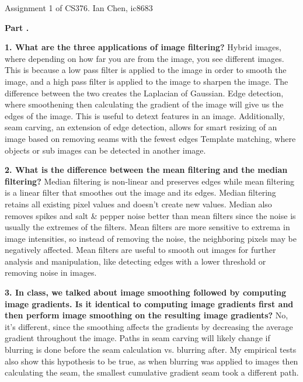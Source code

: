 \documentclass[11pt]{article}
\begin{document}
    Assignment 1 of CS376. Ian Chen, ic8683\newline
    
    \textbf{Part .}\newline

    \textbf{1. What are the three applications of image filtering?}\newline
    Hybrid images, where depending on how far you are from the image, you see different images.
    This is because a low pass filter is applied to the image in order to smooth the image, and a high pass filter is applied to the image
    to sharpen the image. The difference between the two creates the Laplacian of Gaussian.\newline
    Edge detection, where smoothening then calculating the gradient of the image will give us the edges of the image. This is useful to detext
    features in an image. Additionally, seam carving, an extension of edge detection, allows for smart resizing of an image based on removing seams
with the fewest edges\newline
    Template matching, where objects or sub images can be detected in another image.\newline

    \textbf{2. What is the difference between the mean filtering and the median filtering?}\newline
    Median filtering is non-linear and preserves edges while mean filtering is a linear filter that smoothes out the image and its edges.
    Median filtering retains all existing pixel values and doesn’t create new values. Median also removes spikes and salt \& pepper noise better
    than mean filters since the noise is usually the extremes of the filters. Mean filters are more sensitive to extrema in image intensities, so
    instead of removing the noise, the neighboring pixels may be negatively affected. Mean filters are useful to smooth out images for further analysis
    and manipulation, like detecting edges with a lower threshold or removing noise in images.\newline

    \textbf{3. In class, we talked about image smoothing followed by computing image gradients.
    Is it identical to computing image gradients first and then perform image smoothing on the resulting image gradients?}\newline
    No, it’s different, since the smoothing affects the gradients by decreasing the average gradient throughout the image. Paths in seam carving will
    likely change if blurring is done before the seam calculation vs. blurring after. My empirical tests also show this hypothesis to be true, as
    when blurring was applied to images then calculating the seam, the smallest cumulative gradient seam took a different path.\newline
    
\end{document}
